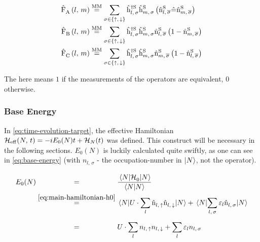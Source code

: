 \begin{equation}
    \label{eq:interaction-picture-v-ham-parts-simplified}
    \begin{split}
        \VhamiltonianOperatorPart{A}{l}{m} &\stackrel{\text{MM}}{=} 
        \lsum[\sigma \in \left\{\up,\,\down\right\}]
        \withspinhcop[\schroedingerPicture]{l}{\sigma}{\dagger}\withspinhcop[\schroedingerPicture]{m}{\sigma}{}
        \left(\nop[\schroedingerPicture]{l}{\overline{\sigma}}
            \equivalentOperator 
            \nop[\schroedingerPicture]{m}{\overline{\sigma}}
        \right)
        \\
        \VhamiltonianOperatorPart{B}{l}{m} &\stackrel{\text{MM}}{=} 
        \lsum[\sigma \in \left\{\up,\,\down\right\}]        
        \withspinhcop[\schroedingerPicture]{l}{\sigma}{\dagger}\withspinhcop[\schroedingerPicture]{m}{\sigma}{}
        \nop[\schroedingerPicture]{l}{\overline{\sigma}}
        \left(
            1 - \nop[\schroedingerPicture]{m}{\overline{\sigma}}
        \right)
        \\
        \VhamiltonianOperatorPart{C}{l}{m} &\stackrel{\text{MM}}{=} 
        \lsum[\sigma \in \left\{\up,\,\down\right\}]
        \withspinhcop[\schroedingerPicture]{l}{\sigma}{\dagger}\withspinhcop[\schroedingerPicture]{m}{\sigma}{}
        \nop[\schroedingerPicture]{m}{\overline{\sigma}}
        \left(
           1 - \nop[\schroedingerPicture]{l}{\overline{\sigma}}
        \right)
        \\
    \end{split}
\end{equation}

The \equivalentOperator here means \glqq $1$ if the measurements of the operators are equivalent, $0$ otherwise\grqq.

\subsubsection*{Base Energy}

In \autoref{eq:time-evolution-target}, the effective Hamiltonian ${\mathcal{H}_\text{eff}}^{}({N},\,t) = -i E_0(N) t + \mathcal{H}_{N}(t)$ was defined.
This construct will be necessary in the following sections. 
$E_0(N)$ is luckily calculated quite swiftly, as one can see in \autoref{eq:base-energy} (with $n_{l,\,\sigma}$ - the occupation-number in $\ket{N}$, not the operator).

\begin{equation}
    \label{eq:base-energy}
    \begin{split}
        E_0(N) &\stackrel{\phantom{\ref{eq:main-hamiltonian-h0}}}{=} \frac{\bracketHelper{N}{\HzeroHamiltonian[]}{N}}{\braketHelper{N}{N}} \\
        &\stackrel{\ref{eq:main-hamiltonian-h0}}{=} \bracketHelper{N}{U \cdot \lsum \nop{l}{\up}\nop{l}{\down}}{N} + \bracketHelper{N}{\lsum[l,\,\sigma] \epsl \nop{l}{\sigma}}{N}\\
        &\stackrel{\phantom{\ref{eq:main-hamiltonian-h0}}}{=} U \cdot \lsum n_{l,\,\up}n_{l,\,\down} + \lsum \epsl n_{l,\,\sigma}
    \end{split}
\end{equation}

